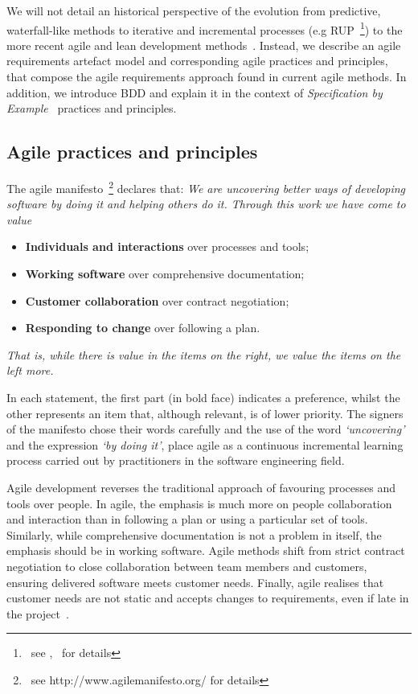 \documentclass[dissertation,final]{softeng}
\begin{document}
We will not detail an historical perspective of the evolution from predictive, waterfall-like methods to iterative and incremental processes (e.g RUP~\footnote{~see ,~\citet{Kruchten2003} for details}) to the more recent agile and lean development methods~\citep{Leffingwell2011,Larman2003}. Instead, we describe an agile requirements artefact model and corresponding agile practices and principles, that compose the agile requirements approach found in current agile methods. In addition, we introduce BDD and explain it in the context of \emph{Specification by Example}~\citep{Adzic201106} practices and principles.

\subsection{Agile practices and principles}
The agile manifesto~\footnote{~see http://www.agilemanifesto.org/ for details} declares that: 
\emph{We are uncovering better ways of developing software by doing it and helping others do it. Through this work we have come to value}

\begin{itemize}
\item \textbf{Individuals and interactions} over processes and tools;
\item \textbf{Working software} over comprehensive documentation;
\item \textbf{Customer collaboration} over contract negotiation;
\item \textbf{Responding to change} over following a plan.
\end{itemize}
\emph{That is, while there is value in the items on the right, we value the items on the left more.}

In each statement, the first part (in bold face) indicates a preference, whilst the other represents an item that, although relevant, is of lower priority. The signers of the manifesto chose their words carefully and the use of the word \emph{`uncovering'} and the expression \emph{`by doing it'}, place agile as a continuous incremental learning process carried out by practitioners in the software engineering field.

Agile development reverses the traditional approach of favouring processes and tools over people. In agile, the emphasis is much more on people collaboration and interaction than in following a plan or using a particular set of tools. Similarly, while comprehensive documentation is not a problem in itself, the emphasis should be in working software. Agile methods shift from strict contract negotiation to close collaboration between team members and customers, ensuring delivered software meets customer needs. Finally, agile realises that customer needs are not static and accepts changes to requirements, even if late in the project~\citep{Highsmith:2000:ASD:323922}. 
\end{document}
